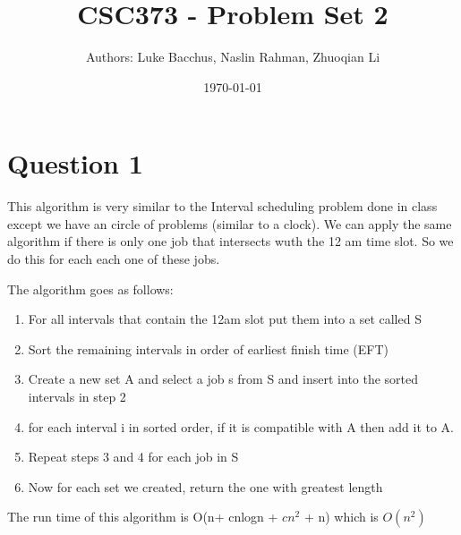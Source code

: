 \documentclass[12pt]{article}
\title{\textbf{CSC373 - Problem Set 2}}
\author{Authors: Luke Bacchus, Naslin Rahman, Zhuoqian Li}
\date{\today}
\begin{document}
\maketitle
\section*{Question 1}
This algorithm is very similar to the Interval scheduling problem done in class except we have an circle of problems (similar to a clock). We can apply the same algorithm if there is only one job that intersects wuth the 12 am time slot. So we do this for each each one of these jobs.
 
 The algorithm goes as follows:
 \begin{enumerate}
     \item For all intervals that contain the 12am slot put them into a set called S
     \item Sort the remaining intervals in order of earliest finish time (EFT)
     \item Create a new set A and select a job s from S and insert into the sorted intervals in step 2
     \item for each interval i in sorted order, if it is compatible with A then add it to A. 
     \item Repeat steps 3 and 4 for each job in S 
     \item Now for each set we created, return the one with greatest length
 \end{enumerate}

The run time of this algorithm is O(n+ cnlogn + $cn^2$ + n) which is $O(n^2)$
\end{document}

